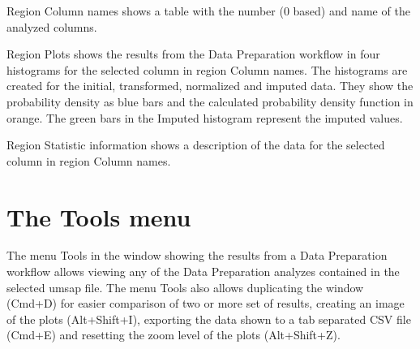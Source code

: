 Region Column names shows a table with the number (\num{0} based) and name of the
analyzed columns. 

Region Plots shows the results from the Data Preparation workflow in four histograms
for the selected column in region Column names. The histograms are created for the
initial, transformed, normalized and imputed data. They show the probability density
as blue bars and the calculated probability density function in orange. The green bars
in the Imputed histogram represent the imputed values.

Region Statistic information shows a description of the data for the selected column
in region Column names.

\section{The Tools menu}

The menu Tools in the window showing the results from a Data Preparation workflow
allows viewing any of the Data Preparation analyzes contained in the selected
umsap file. The menu Tools also allows duplicating the window (Cmd+D) for easier
comparison of two or more set of results, creating an image of the plots (Alt+Shift+I),
exporting the data shown to a tab separated CSV file (Cmd+E) and resetting the zoom
level of the plots (Alt+Shift+Z).